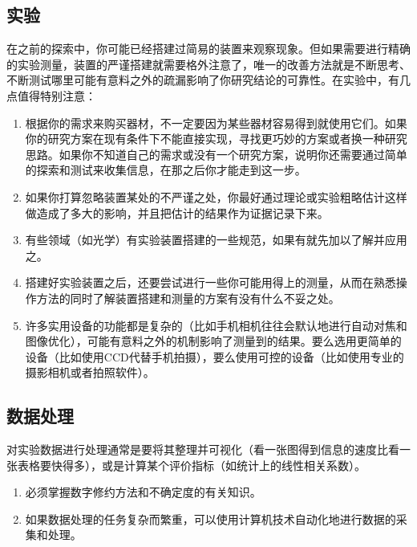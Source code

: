 \documentclass[a4paper,10pt,english]{sphinxmanual}
\begin{document}
\subsection{实验}
\label{\detokenize{6. Research:id6}}
在之前的探索中，你可能已经搭建过简易的装置来观察现象。但如果需要进行精确的实验测量，装置的严谨搭建就需要格外注意了，唯一的改善方法就是不断思考、不断测试哪里可能有意料之外的疏漏影响了你研究结论的可靠性。在实验中，有几点值得特别注意：
\begin{enumerate}
\item {} 
根据你的需求来购买器材，不一定要因为某些器材容易得到就使用它们。如果你的研究方案在现有条件下不能直接实现，寻找更巧妙的方案或者换一种研究思路。如果你不知道自己的需求或没有一个研究方案，说明你还需要通过简单的探索和测试来收集信息，在那之后你才能走到这一步。

\item {} 
如果你打算忽略装置某处的不严谨之处，你最好通过理论或实验粗略估计这样做造成了多大的影响，并且把估计的结果作为证据记录下来。

\item {} 
有些领域（如光学）有实验装置搭建的一些规范，如果有就先加以了解并应用之。

\item {} 
搭建好实验装置之后，还要尝试进行一些你可能用得上的测量，从而在熟悉操作方法的同时了解装置搭建和测量的方案有没有什么不妥之处。

\item {} 
许多实用设备的功能都是复杂的（比如手机相机往往会默认地进行自动对焦和图像优化），可能有意料之外的机制影响了测量到的结果。要么选用更简单的设备（比如使用CCD代替手机拍摄），要么使用可控的设备（比如使用专业的摄影相机或者拍照软件）。

\end{enumerate}


\subsection{数据处理}
\label{\detokenize{6. Research:id7}}
对实验数据进行处理通常是要将其整理并可视化（看一张图得到信息的速度比看一张表格要快得多），或是计算某个评价指标（如统计上的线性相关系数）。
\begin{enumerate}
\item {} 
必须掌握数字修约方法和不确定度的有关知识。

\item {} 
如果数据处理的任务复杂而繁重，可以使用计算机技术自动化地进行数据的采集和处理。

\end{enumerate}
\end{document}
